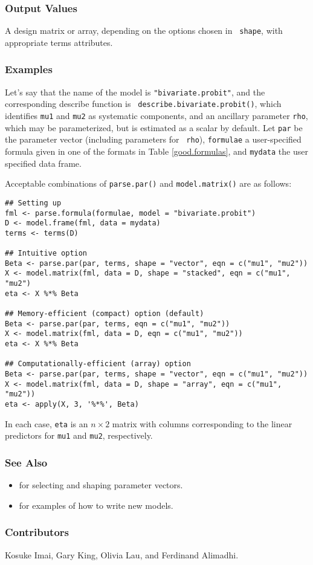 \subsubsection{Output Values}
A design matrix or array, depending on the options chosen in {\tt
shape}, with appropriate terms attributes.  

\subsubsection{Examples}
Let's say that the name of the model is {\tt "bivariate.probit"}, and
the corresponding describe function is {\tt
describe.bivariate.probit()}, which identifies {\tt mu1} and {\tt mu2}
as systematic components, and an ancillary parameter {\tt rho}, which
may be parameterized, but is estimated as a scalar by default.  Let
{\tt par} be the parameter vector (including parameters for {\tt
rho}), {\tt formulae} a user-specified formula given in one of the
formats in Table \ref{good.formulas}, and {\tt mydata} the user
specified data frame.  

Acceptable combinations of {\tt parse.par()} and {\tt model.matrix()}
are as follows:
\begin{verbatim}
## Setting up
fml <- parse.formula(formulae, model = "bivariate.probit")
D <- model.frame(fml, data = mydata)
terms <- terms(D)

## Intuitive option
Beta <- parse.par(par, terms, shape = "vector", eqn = c("mu1", "mu2"))
X <- model.matrix(fml, data = D, shape = "stacked", eqn = c("mu1", "mu2")
eta <- X %*% Beta

## Memory-efficient (compact) option (default)
Beta <- parse.par(par, terms, eqn = c("mu1", "mu2"))    
X <- model.matrix(fml, data = D, eqn = c("mu1", "mu2"))
eta <- X %*% Beta

## Computationally-efficient (array) option
Beta <- parse.par(par, terms, shape = "vector", eqn = c("mu1", "mu2"))
X <- model.matrix(fml, data = D, shape = "array", eqn = c("mu1", "mu2"))
eta <- apply(X, 3, '%*%', Beta)
\end{verbatim}
In each case, {\tt eta} is an $n \times 2$ matrix with columns
corresponding to the linear predictors for {\tt mu1} and {\tt mu2},
respectively.  

\subsubsection{See Also}
\begin{itemize}
\item {} for selecting and shaping parameter vectors.  
\item {} for examples of how to write new models.  
\end{itemize}

\subsubsection{Contributors}

Kosuke Imai, Gary King, Olivia Lau, and Ferdinand Alimadhi.














